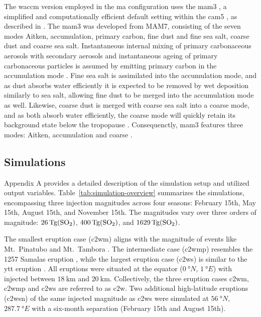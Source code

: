 \documentclass{ametsocV6.1}
\newcommand{\iso}[1][i]{{#1}njected \ce{SO2}}
\begin{document}
The \gls{waccm} version employed in the \gls{ma} configuration uses the \gls{mam3}
\citep{gettleman2019}, a simplified and computationally efficient default setting within
the \gls{cam5} \citep{liu2016}, as described in \citet{liu2012}. The \gls{mam3} was
developed from MAM7, consisting of the seven modes Aitken, accumulation, primary carbon,
fine dust and fine sea salt, coarse dust and coarse sea salt. Instantaneous internal
mixing of primary carbonaceous aerosols with secondary aerosols and instantaneous ageing
of primary carbonaceous particles is assumed by emitting primary carbon in the
accumulation mode \citep{liu2016}. Fine sea salt is assimilated into the accumulation
mode, and as dust absorbs water efficiently it is expected to be removed by wet
deposition similarly to sea salt, allowing fine dust to be merged into the accumulation
mode as well. Likewise, coarse dust is merged with coarse sea salt into a coarse mode,
and as both absorb water efficiently, the coarse mode will quickly retain its background
state below the tropopause \citep{liu2012}. Consequenctly, \gls{mam3} features three
modes: Aitken, accumulation and coarse \citep{liu2016}.

\subsection{Simulations}

Appendix A provides a detailed description of the simulation setup and utilized output
variables. Table~\ref{tab:simulation-overview} summarizes the simulations, encompassing
three  injection magnitudes across four seasons: February 15th, May 15th, August
15th, and November 15th. The magnitudes vary over three orders of magnitude:
\(\SI{26}{\tera\gram(\ce{SO2})}\), \(\SI{400}{\tera\gram(\ce{SO2})}\), and
\(\SI{1629}{\tera\gram(\ce{SO2})}\).

The smallest eruption case (\gls{c2wm}) aligns with the magnitude of events like Mt.\
Pinatubo \citep[\(\sim10\)--\(\SI{20}{\tera\gram(\ce{SO2})}\);~e.g.][]{timmreck2018} and
Mt.\ Tambora \citep[\(\sim\SI{56.2}{\tera\gram(\ce{SO2})}\);~e.g.][]{zanchettin2016}.
The intermediate case (\gls{c2wmp}) resembles the 1257 Samalas eruption
\citep[\(\sim{118.8}\)--\(\SI{173.1}{\tera\gram(\ce{SO2})}\);~e.g.][]{toohey2017,ottobliesner2016},
while the largest eruption case (\gls{c2ws}) is similar to the \gls{ytt} eruption
\citep[\(100\)--\(\SI{10000}{\tera\gram()}\);~e.g.][]{jones2005}. All eruptions
were situated at the equator (\(\SI{0}{\degree N}\), \(\SI{1}{\degree E}\)) with
\ce{SO2} injected between \(\SI{18}{\kilo\meter}\) and \(\SI{20}{\kilo\meter}\).
Collectively, the three eruption cases \gls{c2wm}, \gls{c2wmp} and \gls{c2ws} are
referred to as \gls{c2w}. Two additional high-latitude eruptions (\gls{c2wsn}) of the
same \iso{} magnitude as \gls{c2ws} were simulated at \(\SI{56}{\degree N}\),
\(\SI{287.7}{\degree E}\) with a six-month separation (February 15th and August 15th).
\end{document}
